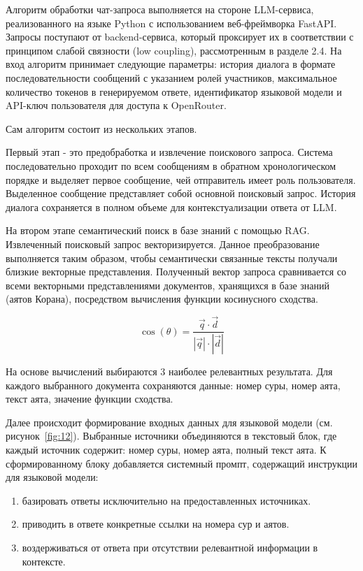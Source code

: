Алгоритм обработки чат-запроса выполняется на стороне LLM-сервиса, реализованного на языке Python с использованием веб-фреймворка FastAPI. Запросы поступают от backend-сервиса, который проксирует их в соответствии с принципом слабой связности (low coupling), рассмотренным в разделе 2.4. На вход алгоритм принимает следующие параметры: история диалога в формате последовательности сообщений с указанием ролей участников, максимальное количество токенов в генерируемом ответе,  идентификатор языковой модели и API-ключ пользователя для доступа к OpenRouter.


Сам алгоритм состоит из нескольких этапов.


Первый этап - это предобработка и извлечение поискового запроса. Система последовательно проходит по всем сообщениям в обратном хронологическом порядке и выделяет первое сообщение, чей отправитель имеет роль пользователя. Выделенное сообщение представляет собой основной поисковый запрос. История диалога сохраняется в полном объеме для контекстуализации ответа от LLM.


На втором этапе семантический поиск в базе знаний с помощью RAG. Извлеченный поисковый запрос векторизируется. Данное преобразование выполняется таким образом, чтобы семантически связанные тексты получали близкие векторные представления. Полученный вектор запроса сравнивается со всеми векторными представлениями документов, хранящихся в базе знаний (аятов Корана), посредством вычисления функции косинусного сходства.


\begin{equation}
	\label{eq:cosine}
	\cos(\theta) = \frac{\vec{q} \cdot \vec{d}}{|\vec{q}| \cdot |\vec{d}|}
\end{equation}


На основе вычислений выбираются 3 наиболее релевантных результата. Для каждого выбранного документа сохраняются данные: номер суры, номер аята, текст аята, значение функции сходства.


Далее происходит формирование входных данных для языковой модели (см. рисунок~\ref{fig:12}). Выбранные источники объединяются в текстовый блок, где каждый источник содержит: номер суры, номер аята, полный текст аята. К сформированному блоку добавляется системный промпт, содержащий инструкции для языковой модели:

\begin{enumerate}
	\item базировать ответы исключительно на предоставленных источниках.
	\item приводить в ответе конкретные ссылки на номера сур и аятов.
	\item воздерживаться от ответа при отсутствии релевантной информации в контексте.
\end{enumerate}

